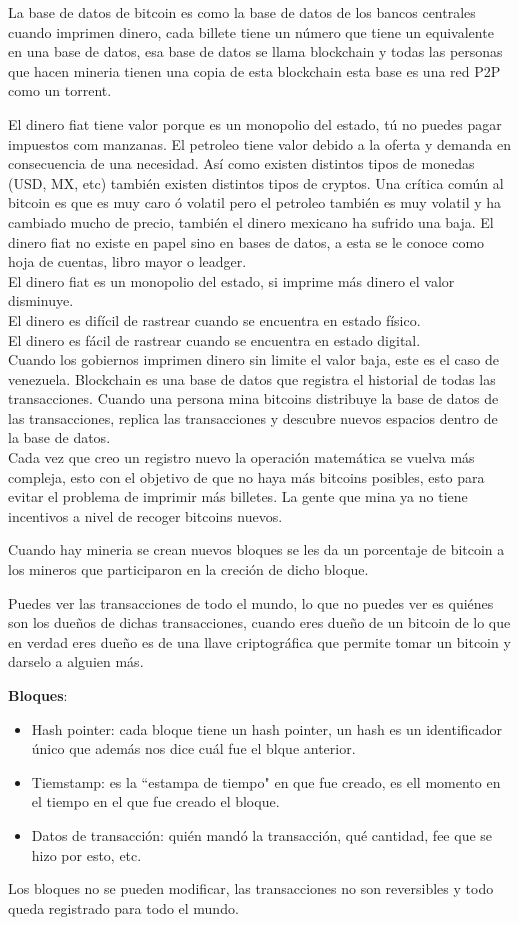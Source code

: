 \documentclass[a4paper,12pt]{/home/armando/Documentos/Cursos/LaTeX/Plantillas/lib/pub}
\begin{document}
La base de datos de bitcoin es como la base de datos de los bancos centrales cuando imprimen dinero, cada billete tiene un número que tiene un equivalente en una base de datos, esa base de datos se llama blockchain y todas las personas que hacen mineria tienen una copia de esta blockchain esta base es una red P2P como un torrent.

El dinero fiat tiene valor porque es un monopolio del estado, tú no puedes pagar impuestos com manzanas.
El petroleo tiene valor debido a la oferta y demanda en consecuencia de una necesidad.
Así como existen distintos tipos de monedas (USD, MX, etc) también existen distintos tipos de cryptos.
Una crítica común al bitcoin es que es muy caro ó volatil pero el petroleo también es muy volatil y ha cambiado mucho de precio, también el dinero mexicano ha sufrido una baja.
El dinero fiat no existe en papel sino en bases de datos, a esta se le conoce como hoja de cuentas, libro mayor o leadger.\\
El dinero fiat es un monopolio del estado, si imprime más dinero el valor disminuye.\\
El dinero es difícil de rastrear cuando se encuentra en estado físico.\\
El dinero es fácil de rastrear cuando se encuentra en estado digital.\\

Cuando los gobiernos imprimen dinero sin limite el valor baja, este es el caso de venezuela.
Blockchain es una base de datos que registra el historial de todas las transacciones.
Cuando una persona mina bitcoins distribuye la base de datos de las transacciones, replica las transacciones y descubre nuevos espacios dentro de la base de datos.\\
Cada vez que creo un registro nuevo la operación matemática se vuelva más compleja, esto con el objetivo de que no haya más bitcoins posibles, esto para evitar el problema de imprimir más billetes. La gente que mina ya no tiene incentivos a nivel de recoger bitcoins nuevos.

Cuando hay mineria se crean nuevos bloques se les da un porcentaje de bitcoin a los mineros que participaron en la creción de dicho bloque.

Puedes ver las transacciones de todo el mundo, lo que no puedes ver es quiénes son los dueños de dichas transacciones, cuando eres dueño de un bitcoin de lo que en verdad eres dueño es de una llave criptográfica que permite tomar un bitcoin y darselo a alguien más.

\textbf{Bloques}:
\begin{itemize}
\item Hash pointer: cada bloque tiene un hash pointer, un hash es un identificador único que además nos dice cuál fue el blque anterior.
\item Tiemstamp: es la ``estampa de tiempo" en que fue creado, es ell momento en el tiempo en el que fue creado el bloque.
\item Datos de transacción: quién mandó la transacción, qué cantidad, fee que se hizo por esto, etc.
\end{itemize}
Los bloques no se pueden modificar, las transacciones no son reversibles y todo queda registrado para todo el mundo.
\end{document}
